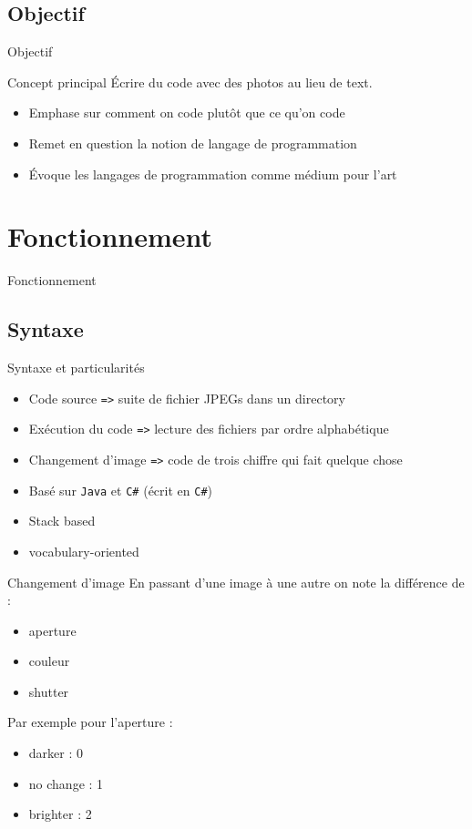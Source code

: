\documentclass[xcolor={dvipsnames,svgnames}]{beamer}
\begin{document}
\subsection{Objectif}
\begin{frame}{Objectif}
	\begin{block}{Concept principal}
		Écrire du code avec des photos au lieu de text.
	\end{block}

	\hfill
	
	\begin{itemize}
		\item Emphase sur comment on code plutôt que ce qu'on code
		\item Remet en question la notion de langage de programmation
		\item Évoque les langages de programmation comme médium pour l'art
	\end{itemize}
\end{frame}


\section{Fonctionnement}
\begin{frame}
	\centering
	\Large Fonctionnement
\end{frame}

\subsection{Syntaxe}
\begin{frame}{Syntaxe et particularités}
	\begin{itemize}
		\item Code source {\tt =>} suite de fichier JPEGs dans un directory
		\item Exécution du code {\tt =>} lecture des fichiers par ordre alphabétique
		\item Changement d'image {\tt =>} code de trois chiffre qui fait quelque chose 
		\item Basé sur {\tt Java} et {\tt C\#} (écrit en {\tt C\#})
		\item Stack based
		\item vocabulary-oriented
	\end{itemize}
\end{frame}

\begin{frame}{Changement d'image}
	En passant d'une image à une autre on note la différence de :
	\begin{itemize}
		\item aperture
		\item couleur
		\item shutter
	\end{itemize}
	
	\hfill

	Par exemple pour l'aperture :
	\begin{itemize}
		\item darker : 0
		\item no change : 1
		\item brighter : 2
	\end{itemize}
\end{frame}
\end{document}
